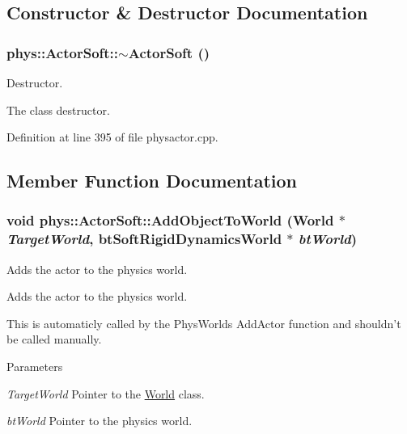 \subsection{Constructor \& Destructor Documentation}
\hypertarget{classphys_1_1ActorSoft_a636c145f1e468fd45adc8da2a1708fbe}{
\subsubsection[{$\sim$ActorSoft}]{\setlength{\rightskip}{0pt plus 5cm}phys::ActorSoft::$\sim$ActorSoft ()}}
\label{d4/d23/classphys_1_1ActorSoft_a636c145f1e468fd45adc8da2a1708fbe}


Destructor. 

The class destructor. 

Definition at line 395 of file physactor.cpp.



\subsection{Member Function Documentation}
\hypertarget{classphys_1_1ActorSoft_a3a704ab32f847a5d0e060f8a592efefd}{
\subsubsection[{AddObjectToWorld}]{\setlength{\rightskip}{0pt plus 5cm}void phys::ActorSoft::AddObjectToWorld ({\bf World} $\ast$ {\em TargetWorld}, \/  btSoftRigidDynamicsWorld $\ast$ {\em btWorld})}}
\label{d4/d23/classphys_1_1ActorSoft_a3a704ab32f847a5d0e060f8a592efefd}


Adds the actor to the physics world. 

Adds the actor to the physics world. \par
 This is automaticly called by the PhysWorlds AddActor function and shouldn't be called manually. 
\begin{DoxyParams}{Parameters}
\item[{\em TargetWorld}]Pointer to the \hyperlink{classphys_1_1World}{World} class. \item[{\em btWorld}]Pointer to the physics world. \end{DoxyParams}


